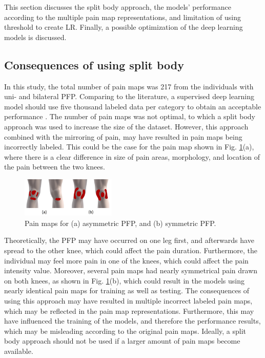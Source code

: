 This section discusses the split body approach, the models' performance according to the multiple pain map representations, and limitation of using threshold to create LR. Finally, a possible optimization of the deep learning models is discussed.

\subsection{Consequences of using split body}
In this study, the total number of pain maps was 217 from the individuals with uni- and bilateral PFP. Comparing to the literature, a supervised deep learning model should use five thousand labeled data per category to obtain an acceptable performance \citep{Goodfellow2016}.
\noindent
The number of pain maps was not optimal, to which a split body approach was used to increase the size of the dataset. However, this approach combined with the mirroring of pain, may have resulted in pain maps being incorrectly labeled. This could be the case for the pain map shown in Fig. \ref{fig:bipainmap}(a), where there is a clear difference in size of pain areas, morphology, and location of the pain between the two knees. 
\begin{figure}[H]
\centering
\includegraphics[width=0.4\textwidth]{Figures/Simmetry}
\caption{Pain maps for (a) asymmetric PFP, and (b) symmetric PFP.}
\label{fig:bipainmap}
\end{figure}

\noindent
Theoretically, the PFP may have occurred on one leg first, and afterwards have spread to the other knee, which could affect the pain duration. Furthermore, the individual may feel more pain in one of the knees, which could affect the pain intensity value.
Moreover, several pain maps had nearly symmetrical pain drawn on both knees, as shown in Fig. \ref{fig:bipainmap}(b), which could result in the models using nearly identical pain maps for training as well as testing.\newline
\noindent
The consequences of using this approach may have resulted in multiple incorrect labeled pain maps, which may be reflected in the pain map representations. Furthermore, this may have influenced the training of the models, and therefore the performance results, which may be misleading according to the original pain maps. Ideally, a split body approach should not be used if a larger amount of pain maps become available.


